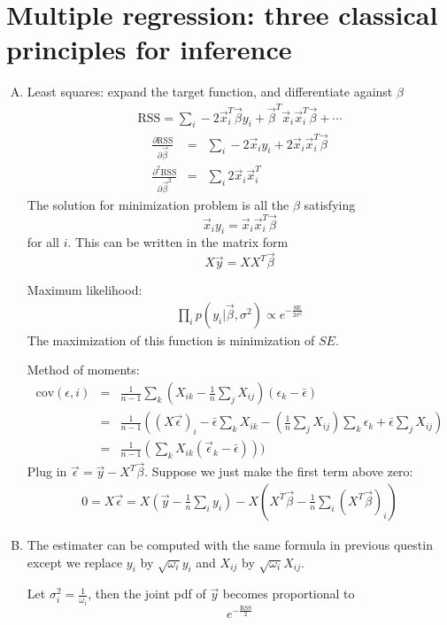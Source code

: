 \documentclass{article}
\begin{document}
\section{Multiple regression: three classical principles for inference}
\begin{enumerate}[(A)]
\item
Least squares: expand the target function, and differentiate against $\beta$
\begin{eqnarray}
\textrm{RSS}=\sum_i-2\vec{x}_i^T\vec{\beta}y_i+\vec{\beta}^T\vec{x}_i\vec{x}_i^T\vec{\beta}+\cdots
\end{eqnarray}
\begin{eqnarray}
\frac{\partial\textrm{RSS}}{\partial\vec{\beta}}&=&\sum_i-2\vec{x}_iy_i+2\vec{x}_i\vec{x}_i^T\vec{\beta}\\
\frac{\partial^2\textrm{RSS}}{\partial\vec{\beta}^2}&=&\sum_i2\vec{x}_i\vec{x}_i^T
\end{eqnarray}
The solution for minimization problem is all the $\beta$ satisfying
\begin{equation}
\vec{x}_iy_i=\vec{x}_i\vec{x}^T_i\vec{\beta}
\end{equation}
for all $i$. This can be written in the matrix form
\begin{equation}
X\vec{y}=XX^T\vec{\beta}
\end{equation}

Maximum likelihood: 
\begin{eqnarray}
\prod_i p(y_i|\vec{\beta},\sigma^2)\propto e^{-\frac{\textrm{SE}}{2\sigma^2}}
\end{eqnarray}
The maximization of this function is minimization of $SE$.

Method of moments:
\begin{eqnarray}
\textrm{cov}(\epsilon,i)&=&\frac{1}{n-1}\sum_k(X_{ik}-\frac{1}{n}\sum_j X_{ij})(\epsilon_k-\bar{\epsilon})\nonumber\\
&=&\frac{1}{n-1}((X\vec{\epsilon})_i-\bar{\epsilon}\sum_kX_{ik}-(\frac{1}{n}\sum_jX_{ij})\sum_k\epsilon_k+\bar{\epsilon}\sum_jX_{ij})\nonumber\\
&=&\frac{1}{n-1}(\sum_kX_{ik}(\vec{\epsilon}_k-\bar{\epsilon})))
\end{eqnarray}
Plug in $\vec{\epsilon}=\vec{y}-X^T\vec{\beta}$. Suppose we just make the first term above zero:
\begin{eqnarray}
0=X\vec{\epsilon}=X(\vec{y}-\frac{1}{n}\sum_iy_i)-X(X^T\vec{\beta}-\frac{1}{n}\sum_i(X^T\vec{\beta})_i)
\end{eqnarray}

\item

The estimater can be computed with the same formula in previous questin except we replace $y_i$ by $\sqrt{\omega_i}y_i$ and $X_{ij}$ by $\sqrt{\omega_i}X_{ij}$.

Let $\sigma_i^2=\frac{1}{\omega_i}$, then the joint pdf of $\vec{y}$ becomes proportional to
\begin{equation}
e^{-\frac{\textrm{RSS}}{2}}
\end{equation}

\end{enumerate}
\end{document}
